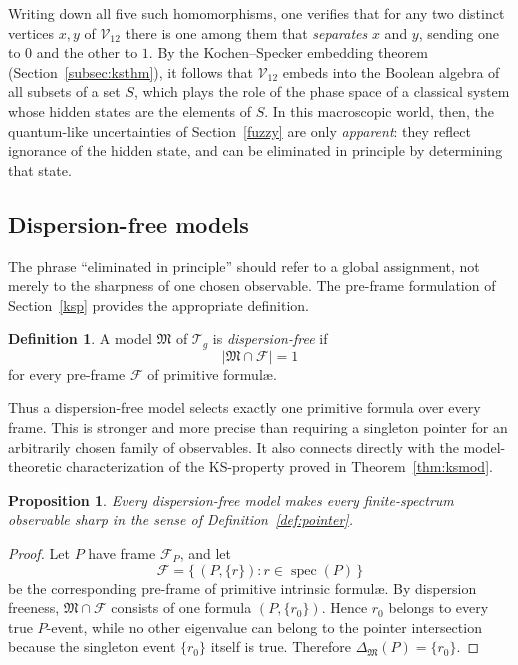 \documentclass{article}   	%
\theoremstyle{plain}
\newtheorem{proposition}[theorem]{Proposition}
\theoremstyle{definition}
\newtheorem{definition}[theorem]{Definition}
\theoremstyle{remark}
\DeclareMathOperator{\spec}{spec}
\begin{document}
Writing down all five such homomorphisms, one verifies that for any two distinct
vertices $x,y$ of $\mathcal V_{12}$ there is one among them that \emph{separates}
$x$ and $y$, sending one to $0$ and the other to $1$.
By the Kochen--Specker embedding theorem (Section~\ref{subsec:ksthm}), it follows
that $\mathcal V_{12}$ embeds into the Boolean algebra of all subsets of a set
$S$, which plays the role of the phase space of a classical system whose hidden
states are the elements of $S$.
In this macroscopic world, then, the quantum-like uncertainties of
Section~\ref{fuzzy} are only \emph{apparent}: they reflect ignorance of the
hidden state, and can be eliminated in principle by determining that state.

\subsection{Dispersion-free models}
\label{subsec:dispfree}

The phrase ``eliminated in principle'' should refer to a global assignment, not
merely to the sharpness of one chosen observable.  The pre-frame formulation of
Section~\ref{ksp} provides the appropriate definition.

\begin{definition}
\label{def:dispersion-free}
A model $\mathfrak M$ of $\mathcal T_g$ is \emph{dispersion-free} if
\[
|\mathfrak M\cap\mathcal F|=1
\]
for every pre-frame $\mathcal F$ of primitive formul\ae.
\end{definition}

Thus a dispersion-free model selects exactly one primitive formula over every
frame.  This is stronger and more precise than requiring a singleton pointer for
an arbitrarily chosen family of observables.  It also connects directly with the
model-theoretic characterization of the KS-property proved in
Theorem~\ref{thm:ksmod}.

\begin{proposition}
\label{prop:disp-sharp}
Every dispersion-free model makes every finite-spectrum observable sharp in the
sense of Definition~\ref{def:pointer}.
\end{proposition}

\begin{proof}
Let $P$ have frame $\mathcal F_P$, and let
\[
\mathcal F=\{\,(P,\{r\}):r\in\spec(P)\,\}
\]
be the corresponding pre-frame of primitive intrinsic formul\ae.  By dispersion
freeness, $\mathfrak M\cap\mathcal F$ consists of one formula
$(P,\{r_0\})$.  Hence $r_0$ belongs to every true $P$-event, while no other
eigenvalue can belong to the pointer intersection because the singleton event
$\{r_0\}$ itself is true.  Therefore
$\Delta_{\mathfrak M}(P)=\{r_0\}$.
\end{proof}
\end{document}
